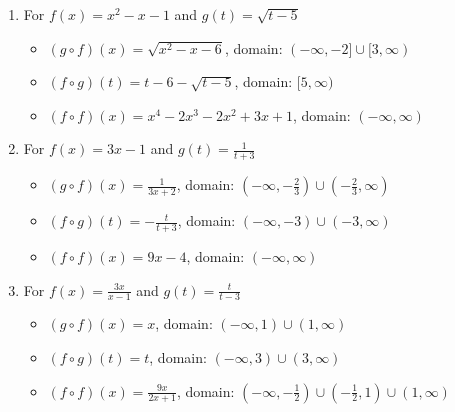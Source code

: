 \begin{enumerate}
\begin{itemize}
\end{itemize}


\enlargethispage{0.25in}

\item For  $f(x) = x^2-x-1$ and $g(t) = \sqrt{t-5}$ 

\begin{itemize}

\item  $(g \circ f)(x) = \sqrt{x^2-x-6}$, domain: $(-\infty, -2] \cup [3,\infty)$

\item  $(f \circ g)(t) =t-6-\sqrt{t-5}$, domain: $[5,\infty)$

\item  $(f \circ f)(x) =x^4-2x^3-2x^2+3x+1$, domain: $(-\infty, \infty)$

\end{itemize}


\item For   $f(x) = 3x-1$ and $g(t) = \frac{1}{t+3}$

\begin{itemize}

\item  $(g \circ f)(x) = \frac{1}{3x+2}$, domain: $\left(-\infty, -\frac{2}{3}\right) \cup \left(-\frac{2}{3}, \infty\right)$

\item  $(f \circ g)(t) = -\frac{t}{t+3}$, domain: $\left(-\infty, -3\right) \cup \left(-3, \infty\right)$

\item  $(f \circ f)(x) = 9x-4$, domain: $(-\infty, \infty)$

\end{itemize}


\item For   $f(x) = \frac{3x}{x-1}$ and $g(t) =\frac{t}{t-3}$

\begin{itemize}

\item  $(g \circ f)(x) =x$, domain: $\left(-\infty, 1\right) \cup (1, \infty)$

\item  $(f \circ g)(t) =t$, domain:  $\left(-\infty, 3\right) \cup (3,\infty)$

\item  $(f \circ f)(x) = \frac{9x}{2x+1}$, domain: $\left(-\infty, -\frac{1}{2}\right) \cup \left(-\frac{1}{2}, 1 \right) \cup \left(1,\infty \right)$


\end{itemize}
\end{enumerate}
